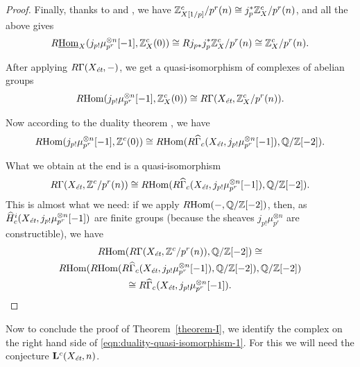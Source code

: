 \documentclass{article}
\numberwithin{equation}{section}
\begin{document}
\begin{proposition}
\begin{proof}
    Finally, thanks to \cite[Theorem 7.2 (a)]{Geisser-2010} and
    \cite[Proposition 2.3]{Geisser-2010}, we have
    $\ZZ^c_{X [1/p]}/p^r (n) \cong j_p^*\ZZ^c_X/p^r (n)$, and all the above
    gives
    \begin{equation}
      R\iHom_X (j_{p!} \mu_{p^r}^{\otimes n} [-1], \ZZ^c_X (0)) \cong
      R j_{p*} j_p^* \ZZ^c_X/p^r (n) \cong \ZZ^c_X/p^r (n).
    \end{equation}

    After applying $R\Gamma (X_\et, -)$, we get a quasi-isomorphism of
    complexes of abelian groups
    \begin{equation}
      \RHom (j_{p!} \mu_{p^r}^{\otimes n} [-1], \ZZ^c_X (0)) \cong
      R\Gamma (X_\et, \ZZ^c_X/p^r (n)).
    \end{equation}

    Now according to the duality theorem \cite[Theorem 7.8]{Geisser-2010},
    we have
    \begin{equation}
      \RHom (j_{p !} \mu_{p^r}^{\otimes n} [-1], \ZZ^c (0)) \cong
      \RHom (R\widehat{\Gamma}_c (X_\et, j_{p !} \mu_{p^r}^{\otimes n} [-1]), \QQ/\ZZ [-2]).
    \end{equation}

    What we obtain at the end is a quasi-isomorphism
    \[ R\Gamma (X_\et, \ZZ^c/p^r (n)) \cong
    \RHom (R\widehat{\Gamma}_c (X_\et, j_{p !} \mu_{p^r}^{\otimes n} [-1]), \QQ/\ZZ [-2]). \]
    This is almost what we need: if we apply $\RHom (-,\QQ/\ZZ [-2])$, then, as
    $\widehat{H}^i_c (X_\et, j_{p!} \mu_{p^r}^{\otimes n} [-1])$ are
    finite groups (because the sheaves $j_{p!} \mu_{p^r}^{\otimes n}$ are
    constructible), we have
    \begin{multline*}
      \RHom (R\Gamma (X_\et, \ZZ^c/p^r (n)), \QQ/\ZZ[-2]) \cong\\
      \RHom (\RHom (R\widehat{\Gamma}_c (X_\et, j_{p !} \mu_{p^r}^{\otimes n} [-1]), \QQ/\ZZ[-2]), \QQ/\ZZ[-2]) \\
      \cong R\widehat{\Gamma}_c (X_\et, j_{p !} \mu_{p^r}^{\otimes n} [-1]). \qedhere
    \end{multline*}
  \end{proof}
\end{proposition}

Now to conclude the proof of Theorem~\ref{theorem-I}, we identify the complex
on the right hand side of \eqref{eqn:duality-quasi-isomorphism-1}. For this we
will need the conjecture $\mathbf{L}^c (X_\et, n)$.
\end{document}
